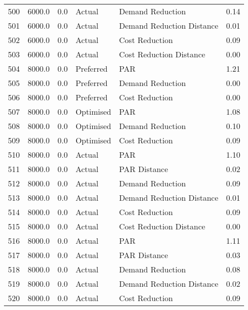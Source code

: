 \begin{longtable}{lrrllr}
500  &       6000.0 &     0.0 &         Actual &           Demand Reduction &   0.14 \\
501  &       6000.0 &     0.0 &         Actual &  Demand Reduction Distance &   0.01 \\
502  &       6000.0 &     0.0 &         Actual &             Cost Reduction &   0.09 \\
503  &       6000.0 &     0.0 &         Actual &    Cost Reduction Distance &   0.00 \\
504  &       8000.0 &     0.0 &      Preferred &                        PAR &   1.21 \\
505  &       8000.0 &     0.0 &      Preferred &           Demand Reduction &   0.00 \\
506  &       8000.0 &     0.0 &      Preferred &             Cost Reduction &   0.00 \\
507  &       8000.0 &     0.0 &      Optimised &                        PAR &   1.08 \\
508  &       8000.0 &     0.0 &      Optimised &           Demand Reduction &   0.10 \\
509  &       8000.0 &     0.0 &      Optimised &             Cost Reduction &   0.09 \\
510  &       8000.0 &     0.0 &         Actual &                        PAR &   1.10 \\
511  &       8000.0 &     0.0 &         Actual &               PAR Distance &   0.02 \\
512  &       8000.0 &     0.0 &         Actual &           Demand Reduction &   0.09 \\
513  &       8000.0 &     0.0 &         Actual &  Demand Reduction Distance &   0.01 \\
514  &       8000.0 &     0.0 &         Actual &             Cost Reduction &   0.09 \\
515  &       8000.0 &     0.0 &         Actual &    Cost Reduction Distance &   0.00 \\
516  &       8000.0 &     0.0 &         Actual &                        PAR &   1.11 \\
517  &       8000.0 &     0.0 &         Actual &               PAR Distance &   0.03 \\
518  &       8000.0 &     0.0 &         Actual &           Demand Reduction &   0.08 \\
519  &       8000.0 &     0.0 &         Actual &  Demand Reduction Distance &   0.02 \\
520  &       8000.0 &     0.0 &         Actual &             Cost Reduction &   0.09 \\

\end{longtable}
